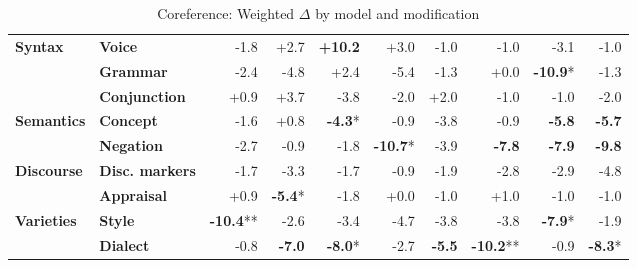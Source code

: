 \begin{table}[h]
{\begin{tabular}{llrrrrrrrr}
\midrule
\textbf{Syntax} & \textbf{Voice} & \cellcolor{red!3} -1.8 & \cellcolor{green!5} +2.7 & \cellcolor{green!20} \textbf{+10.2} & \cellcolor{green!6} +3.0 & \cellcolor{red!2} -1.0 & \cellcolor{red!2} -1.0 & \cellcolor{red!6} -3.1 & \cellcolor{red!2} -1.0 \\
  & \textbf{Grammar} & \cellcolor{red!4} -2.4 & \cellcolor{red!9} -4.8 & \cellcolor{green!4} +2.4 & \cellcolor{red!10} -5.4 & \cellcolor{red!2} -1.3 & \cellcolor{red!0} +0.0 & \cellcolor{red!20} \textbf{-10.9}* & \cellcolor{red!2} -1.3 \\
  & \textbf{Conjunction} & \cellcolor{green!1} +0.9 & \cellcolor{green!7} +3.7 & \cellcolor{red!7} -3.8 & \cellcolor{red!3} -2.0 & \cellcolor{green!3} +2.0 & \cellcolor{red!1} -1.0 & \cellcolor{red!2} -1.0 & \cellcolor{red!4} -2.0 \\
\midrule
\textbf{Semantics} & \textbf{Concept} & \cellcolor{red!3} -1.6 & \cellcolor{green!1} +0.8 & \cellcolor{red!8} \textbf{-4.3}* & \cellcolor{red!1} -0.9 & \cellcolor{red!7} -3.8 & \cellcolor{red!1} -0.9 & \cellcolor{red!11} \textbf{-5.8} & \cellcolor{red!11} \textbf{-5.7} \\
  & \textbf{Negation} & \cellcolor{red!5} -2.7 & \cellcolor{red!1} -0.9 & \cellcolor{red!3} -1.8 & \cellcolor{red!20} \textbf{-10.7}* & \cellcolor{red!7} -3.9 & \cellcolor{red!15} \textbf{-7.8} & \cellcolor{red!15} \textbf{-7.9} & \cellcolor{red!19} \textbf{-9.8} \\
\midrule
\textbf{Discourse} & \textbf{Disc. markers} & \cellcolor{red!3} -1.7 & \cellcolor{red!6} -3.3 & \cellcolor{red!3} -1.7 & \cellcolor{red!1} -0.9 & \cellcolor{red!3} -1.9 & \cellcolor{red!5} -2.8 & \cellcolor{red!5} -2.9 & \cellcolor{red!9} -4.8 \\
  & \textbf{Appraisal} & \cellcolor{green!1} +0.9 & \cellcolor{red!10} \textbf{-5.4}* & \cellcolor{red!3} -1.8 & \cellcolor{red!0} +0.0 & \cellcolor{red!1} -1.0 & \cellcolor{green!1} +1.0 & \cellcolor{red!1} -1.0 & \cellcolor{red!1} -1.0 \\
\midrule
\textbf{Varieties} & \textbf{Style} & \cellcolor{red!20} \textbf{-10.4}** & \cellcolor{red!5} -2.6 & \cellcolor{red!6} -3.4 & \cellcolor{red!9} -4.7 & \cellcolor{red!7} -3.8 & \cellcolor{red!7} -3.8 & \cellcolor{red!15} \textbf{-7.9}* & \cellcolor{red!3} -1.9 \\
  & \textbf{Dialect} & \cellcolor{red!1} -0.8 & \cellcolor{red!14} \textbf{-7.0} & \cellcolor{red!16} \textbf{-8.0}* & \cellcolor{red!5} -2.7 & \cellcolor{red!11} \textbf{-5.5} & \cellcolor{red!20} \textbf{-10.2}** & \cellcolor{red!1} -0.9 & \cellcolor{red!16} \textbf{-8.3}* \\
\bottomrule
\end{tabular}}
\caption{Coreference: Weighted $\Delta$ by model and modification}\label{tab:coref_delta}
\end{table}